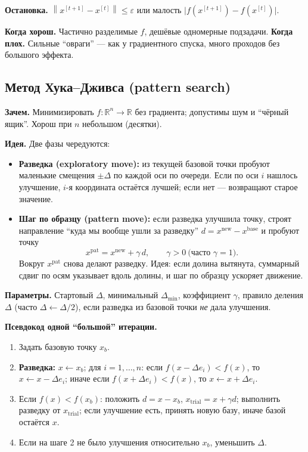 \documentclass[12pt,a4paper]{article}
\newcommand{\R}{\mathbb{R}}
\newcommand{\norm}[1]{\left\lVert #1\right\rVert}
\begin{document}
\textbf{Остановка.} \(\norm{x^{[t+1]}-x^{[t]}}\le\varepsilon\) или малость \(\bigl|f(x^{[t+1]})-f(x^{[t]})\bigr|\).

\textbf{Когда хорош.} Частично разделимые \(f\), дешёвые одномерные подзадачи. \textbf{Когда плох.} Сильные ``овраги'' --- как у градиентного спуска, много проходов без большого эффекта.

\subsection{Метод Хука--Дживса (pattern search)}
\textbf{Зачем.} Минимизировать \(f:\R^n\to\R\) без градиента; допустимы шум и ``чёрный ящик''. Хорош при \(n\) небольшом (десятки).

\textbf{Идея.} Две фазы чередуются:
\begin{itemize}
  \item \textbf{Разведка (exploratory move):} из текущей базовой точки пробуют маленькие смещения \(\pm\Delta\) по каждой оси по очереди. Если по оси \(i\) нашлось улучшение, \(i\)-я координата остаётся лучшей; если нет --- возвращают старое значение.
  \item \textbf{Шаг по образцу (pattern move):} если разведка улучшила точку, строят направление ``куда мы вообще ушли за разведку'' \(d=x^{\mathrm{new}}-x^{\mathrm{base}}\) и пробуют точку
  \[
    x^{\mathrm{pat}}=x^{\mathrm{new}}+\gamma\,d,\qquad \gamma>0\ \text{(часто }\gamma=1\text{)}.
  \]
  Вокруг \(x^{\mathrm{pat}}\) снова делают разведку. Идея: если долина вытянута, суммарный сдвиг по осям указывает вдоль долины, и шаг по образцу ускоряет движение.
\end{itemize}

\textbf{Параметры.} Стартовый \(\Delta\), минимальный \(\Delta_{\min}\), коэффициент \(\gamma\), правило деления \(\Delta\) (часто \(\Delta\leftarrow\Delta/2\)), если разведка из базовой точки \emph{не} дала улучшения.

\textbf{Псевдокод одной ``большой'' итерации.}
\begin{enumerate}
  \item Задать базовую точку \(x_b\).
  \item \textbf{Разведка:} \(x\leftarrow x_b\); для \(i=1,\ldots,n\): если \(f(x-\Delta e_i)<f(x)\), то \(x\leftarrow x-\Delta e_i\); иначе если \(f(x+\Delta e_i)<f(x)\), то \(x\leftarrow x+\Delta e_i\).
  \item Если \(f(x)<f(x_b)\): положить \(d=x-x_b\), \(x_{\mathrm{trial}}=x+\gamma d\); выполнить разведку от \(x_{\mathrm{trial}}\); если улучшение есть, принять новую базу, иначе базой остаётся \(x\).
  \item Если на шаге 2 не было улучшения относительно \(x_b\), уменьшить \(\Delta\).
\end{enumerate}
\end{document}
